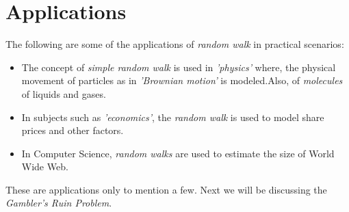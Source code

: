 \documentclass[12pt,a4paper]{article}%
\begin{document}
 	\section{Applications}
 	The following are some of the applications of \textit{random walk} in practical scenarios:
 	\begin{itemize}
 		\item{The concept of \textit{simple random walk} is used in \textit{'physics'} where, the physical movement of particles as in \textit{'Brownian motion'} is modeled.Also, of \textit{molecules} of liquids and gases.}
 		\item{In subjects such as \textit{'economics'}, the \textit{random walk} is used to model share prices and other factors.}
 		\item{In Computer Science, \textit{random walks} are used to estimate the size of World Wide Web.}
 	\end{itemize}
 	These are applications only to mention a few. Next we will be discussing the \textit{Gambler's Ruin Problem}.
\end{document}
